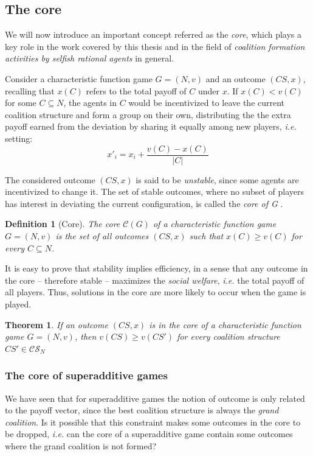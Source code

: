 \documentclass[11pt, twoside, titlepage, a4paper, openright]{report}
\newtheorem{Def}{Definition}
\newtheorem{Th}{Theorem}
\begin{document}
\subsection{The core}\label{subsec:core}

We will now introduce an important concept referred as the \textit{core}, which plays a key role in the work covered by this thesis and in the field of \textit{coalition formation activities by selfish rational agents} in general.

\noindent Consider a characteristic function game $G=(N,v)$ and an outcome $(CS,x)$, recalling that $x(C)$ refers to the total payoff of $C$ under $x$. If $x(C) < v(C)$ for some $C \subseteq N$, the agents in $C$ would be incentivized to leave the current coalition structure and form a group on their own, distributing the the extra payoff earned from the deviation by sharing it equally among new players, \textit{i.e.} setting: $$x'_i=x_i+\frac{v(C)-x(C)}{|C|}$$

\noindent The considered outcome $(CS,x)$ is said to be \textit{unstable}, since some agents are incentivized to change it. The set of stable outcomes, where no subset of players has interest in deviating the current configuration, is called the \textit{core of G} \cite{Gillies1959}. 

\begin{Def}[Core]
The \textit{core} $\mathcal{C}(G)$ of a characteristic function game $G=(N,v)$ is the set of all outcomes $(CS,x)$ such that $x(C) \geq v(C)$ for every $C \subseteq N$.
\end{Def}

\noindent It is easy to prove that stability implies efficiency, in a sense that any outcome in the core -- therefore stable -- maximizes the \textit{social welfare}, \textit{i.e.} the total payoff of all players. Thus, solutions in the core are more likely to occur when the game is played.

\begin{Th}\label{th:coalstr}
If an outcome $(CS,x)$ is in the core of a characteristic function game $G=(N,v)$, then $v(CS) \geq v(CS')$ for every coalition structure $CS' \in \mathcal{CS}_N$
\end{Th}

\subsubsection{The core of superadditive games}

We have seen that for superadditive games the notion of outcome is only related to the payoff vector, since the best coalition structure is always the \textit{grand coalition}. Is it possible that this constraint makes some outcomes in the core to be dropped, \textit{i.e.} can the core of a superadditive game contain some outcomes where the grand coalition is not formed?
\end{document}
